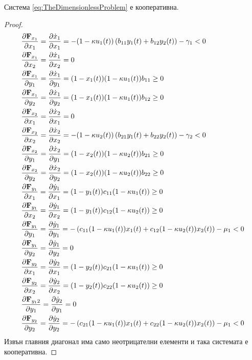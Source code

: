 \begin{proposition}
  Система \ref{eq:TheDimensionlessProblem} е кооперативна.
\end{proposition}

\begin{proof}
  \label{eq:JacobianElements}
  \begin{equation}
    \begin{split}
      &\pdv{\mathbf{F}_{x_1}}{x_1} = \pdv{\dot{x}_1}{x_1} = -(1-\kappa u_1(t)) \left(b_{11} y_1(t) + b_{12} y_2(t)\right) - \gamma_1 < 0 \\
      &\pdv{\mathbf{F}_{x_1}}{x_2} = \pdv{\dot{x}_1}{x_2} = 0 \\
      &\pdv{\mathbf{F}_{x_1}}{y_1} = \pdv{\dot{x}_1}{y_1} = (1-x_1(t)) (1-\kappa u_1(t)) b_{11} \geq 0 \\
      &\pdv{\mathbf{F}_{x_1}}{y_2} = \pdv{\dot{x}_1}{y_2} = (1-x_1(t)) (1-\kappa u_1(t)) b_{12} \geq 0 \\
      &\pdv{\mathbf{F}_{x_2}}{x_1} = \pdv{\dot{x}_2}{x_1} = 0 \\
      &\pdv{\mathbf{F}_{x_2}}{x_2} = \pdv{\dot{x}_2}{x_2} = -(1-\kappa u_2(t)) \left(b_{21} y_1(t) + b_{22} y_2(t)\right) - \gamma_2 < 0 \\
      &\pdv{\mathbf{F}_{x_2}}{y_1} = \pdv{\dot{x}_2}{y_1} = (1-x_2(t)) (1-\kappa u_2(t)) b_{21} \geq 0 \\
      &\pdv{\mathbf{F}_{x_2}}{y_2} = \pdv{\dot{x}_2}{y_2} = (1-x_2(t)) (1-\kappa u_2(t)) b_{22} \geq 0 \\
      &\pdv{\mathbf{F}_{y_1}}{x_1} = \pdv{\dot{y}_1}{x_1} = (1-y_1(t)) c_{11}(1-\kappa u_1(t)) \geq 0 \\
      &\pdv{\mathbf{F}_{y_1}}{x_2} = \pdv{\dot{y}_1}{x_2} = (1-y_1(t)) c_{12}(1-\kappa u_2(t)) \geq 0 \\
      &\pdv{\mathbf{F}_{y_1}}{y_1} = \pdv{\dot{y}_1}{y_1} = -\left(c_{11}(1-\kappa u_1(t)) x_1(t) + c_{12}(1-\kappa u_2(t)) x_2(t)\right) - \mu_1 < 0 \\
      &\pdv{\mathbf{F}_{y_1}}{y_2} = \pdv{\dot{y}_1}{y_2} = 0 \\
      &\pdv{\mathbf{F}_{y_2}}{x_1} = \pdv{\dot{y}_2}{x_1} = (1-y_2(t)) c_{21}(1-\kappa u_1(t)) \geq 0 \\
      &\pdv{\mathbf{F}_{y_2}}{x_2} = \pdv{\dot{y}_2}{x_2} = (1-y_2(t)) c_{22}(1-\kappa u_2(t)) \geq 0 \\
      &\pdv{\mathbf{F}_{y_12}}{y_1} = \pdv{\dot{y}_2}{y_1} = 0 \\
      &\pdv{\mathbf{F}_{y_2}}{y_2} = \pdv{\dot{y}_2}{y_2} = -\left(c_{21}(1-\kappa u_1(t)) x_1(t) + c_{22}(1-\kappa u_2(t)) x_2(t)\right) - \mu_1 < 0
    \end{split}
    \end{equation}
  Извън главния диагонал има само неотрицателни елементи и така системата е кооперативна.
\end{proof}


